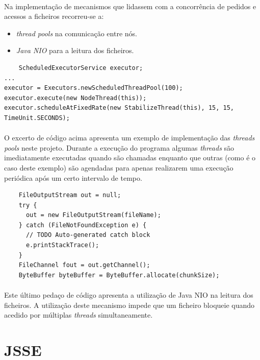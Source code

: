 \documentclass[11pt,oneside]{book}
\begin{document}
\paragraph{}
Na implementação de mecanismos que lidassem com a concorrência de pedidos e acessos a ficheiros 
recorreu-se a:
\begin{itemize}
    \item \textit{thread pools} na comunicação entre nós.
    \item \textit{Java NIO} para a leitura dos ficheiros.
\end{itemize}

\begin{lstlisting}
    ScheduledExecutorService executor;
...
executor = Executors.newScheduledThreadPool(100);
executor.execute(new NodeThread(this));
executor.scheduleAtFixedRate(new StabilizeThread(this), 15, 15, TimeUnit.SECONDS);
\end{lstlisting}

\paragraph{}
O excerto de código acima apresenta um exemplo de implementação das \textit{threads pools} 
neste projeto. Durante a execução do programa algumas \textit{threads} são imediatamente executadas
quando são chamadas enquanto que outras (como é o caso deste exemplo) são agendadas para apenas
realizarem uma execução periódica após um certo intervalo de tempo. 

\begin{lstlisting}
    FileOutputStream out = null;
    try {
      out = new FileOutputStream(fileName);
    } catch (FileNotFoundException e) {
      // TODO Auto-generated catch block
      e.printStackTrace();
    }
    FileChannel fout = out.getChannel();
    ByteBuffer byteBuffer = ByteBuffer.allocate(chunkSize);     
\end{lstlisting}

\paragraph{}
Este último pedaço de código apresenta a utilização de Java NIO na leitura dos ficheiros. A utilização
deste mecanismo impede que um ficheiro bloqueie quando acedido por múltiplas \textit{threads} 
simultaneamente.

\pagebreak

\section{JSSE}
\end{document}
